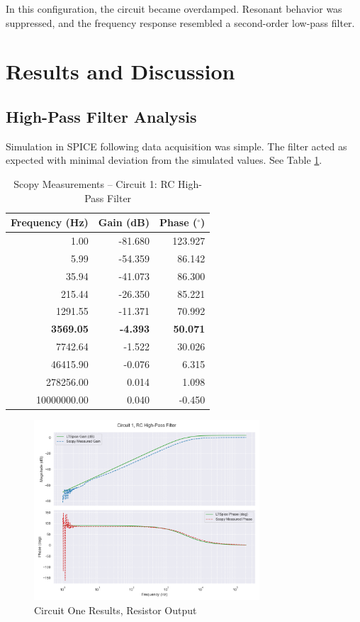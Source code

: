 \documentclass[12pt]{article}
\begin{document}
\noindent In this configuration, the circuit became overdamped. Resonant behavior was suppressed, and the frequency response resembled a second-order low-pass filter.
\section{Results and Discussion}
\subsection{High-Pass Filter Analysis}
Simulation in SPICE following data acquisition was simple. The filter acted as
expected with minimal deviation from the simulated values. See
Table \ref{tab:circuitone}.
\begin{table}[H]
	\centering
	\begin{tabular}{|r|r|r|}
		\hline
		\textbf{Frequency (Hz)} & \textbf{Gain (dB)} & \textbf{Phase ($^\circ$)} \\
		\hline
		1.00                    & -81.680            & 123.927                   \\
		5.99                    & -54.359            & 86.142                    \\
		35.94                   & -41.073            & 86.300                    \\
		215.44                  & -26.350            & 85.221                    \\
		1291.55                 & -11.371            & 70.992                    \\
		\textbf{3569.05}        & \textbf{-4.393}    & \textbf{50.071}           \\
		7742.64                 & -1.522             & 30.026                    \\
		46415.90                & -0.076             & 6.315                     \\
		278256.00               & 0.014              & 1.098                     \\
		10000000.00             & 0.040              & -0.450                    \\
		\hline
	\end{tabular}
	\caption{Scopy Measurements – Circuit 1: RC High-Pass Filter}
	\label{tab:circuitone}
\end{table}
\begin{figure}[H]
	\centering
	\includegraphics[width=0.75\textwidth]{e6_bode1}
	\caption{Circuit One Results, Resistor Output}
	\label{fig:resscopy1}
\end{figure}
\end{document}
